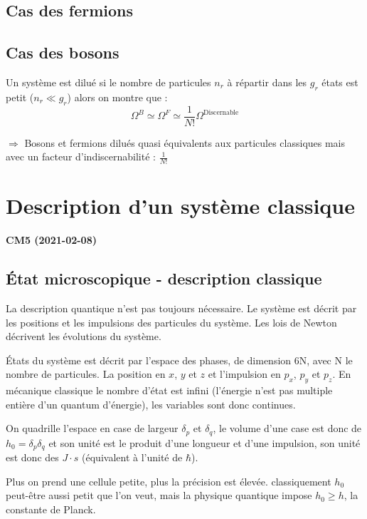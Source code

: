 \documentclass[12pt,a4paper]{report}
\begin{document}
\subsection{Cas des fermions}

\subsection{Cas des bosons}

Un système est dilué si le nombre de particules $n_r$ à répartir dans les $g_r$ états est petit ($n_r \ll g_r$) alors on montre que :
\[
	\Omega^B \simeq \Omega^F \simeq \dfrac{1}{N!}\Omega^{\text{Discernable}}
\]

$\Rightarrow$ Bosons et fermions dilués quasi équivalents aux particules classiques mais avec un facteur d'indiscernabilité : $\frac{1}{N!}$

\section{Description d'un système classique}

\begin{center}
\textbf{CM5 (2021-02-08)}
\end{center}

\subsection{État microscopique - description classique}

La description quantique n'est pas toujours nécessaire. Le système est décrit par les positions et les impulsions des particules du système. Les lois de Newton décrivent les évolutions du système.

États du système est décrit par l'espace des phases, de dimension 6N, avec N le nombre de particules. La position en \(x\), \(y\) et \(z\) et l'impulsion en $p_x$, $p_y$ et $p_z$.
En mécanique classique le nombre d'état est infini (l'énergie n'est pas multiple entière d'un quantum d'énergie), les variables sont donc continues.

On quadrille l'espace en case de largeur $\delta_p$ et $\delta_q$, le volume d'une case est donc de \(h_0 = \delta_p \delta_q\) et son unité est le produit d'une longueur et d'une impulsion, son unité est donc des $J\cdot s$ (équivalent à l'unité de \(\hbar\)).

Plus on prend une cellule petite, plus la précision est élevée. classiquement \(h_0\) peut-être aussi petit que l'on veut, mais la physique quantique impose \(h_0 \geq h\), la constante de Planck.
\end{document}
